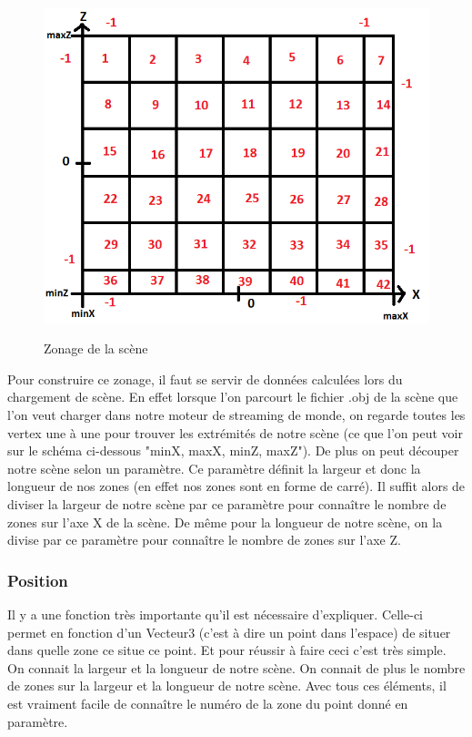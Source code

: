 \documentclass{report}
\begin{document}
			 \begin{figure}[!h]
				\centering
					\includegraphics[scale=0.8]{images/zonage.png}\\
					\caption{Zonage de la scène}
					\label{Zonage de la scène}
			\end{figure}	
			
			 Pour construire ce zonage, il faut se servir de données calculées lors du chargement de scène. En effet lorsque l'on parcourt le fichier .obj de la scène que l'on veut charger dans notre moteur de streaming de monde, on regarde toutes les vertex une à une pour trouver les extrémités de notre scène (ce que l'on peut voir sur le schéma ci-dessous "minX, maxX, minZ, maxZ"). De plus on peut découper notre scène selon un paramètre. Ce paramètre définit la largeur et donc la longueur de nos zones (en effet nos zones sont en forme de carré).  Il suffit alors de diviser la largeur de notre scène par ce paramètre pour connaître le nombre de zones sur l'axe X de la scène. De même pour la longueur de notre scène, on la divise par ce paramètre pour connaître le nombre de zones sur l'axe Z. 

			\subsubsection{Position}					

			Il y a une fonction très importante qu'il est nécessaire d'expliquer. Celle-ci permet en fonction d'un Vecteur3 (c'est à dire un point dans l'espace) de situer dans quelle zone ce situe ce point. Et pour réussir à faire ceci c'est très simple. On connait la largeur et la longueur de notre scène. On connait de plus le nombre de zones sur la largeur et la longueur de notre scène. Avec tous ces éléments, il est vraiment facile de connaître le numéro de la zone du point donné en paramètre.																																											
\end{document}
